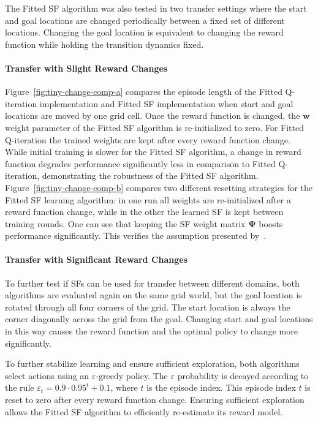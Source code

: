 \documentclass{article}
\begin{document}
The Fitted SF algorithm was also tested in two transfer settings where the start and goal locations are changed periodically between a fixed set of different locations.
Changing the goal location is equivalent to changing the reward function while holding the transition dynamics fixed.

\paragraph{Transfer with Slight Reward Changes}
Figure~\ref{fig:tiny-change-comp-a} compares the episode length of the Fitted Q-iteration implementation and Fitted SF implementation when start and goal locations are moved by one grid cell.
Once the reward function is changed, the $\pmb{w}$ weight parameter of the Fitted SF algorithm is re-initialized to zero.
For Fitted Q-iteration the trained weights are kept after every reward function change.
While initial training is slower for the Fitted SF algorithm, a change in reward function degrades performance significantly less in comparison to Fitted Q-iteration, demonstrating the robustness of the Fitted SF algorithm. 
Figure~\ref{fig:tiny-change-comp-b} compares two different resetting strategies for the Fitted SF learning algorithm: in one run all weights are re-initialized after a reward function change, while in the other the learned SF is kept between training rounds.
One can see that keeping the SF weight matrix $\pmb{\Psi}$ boosts performance significantly.
This verifies the assumption presented by~\citeauthor{barreto2016successor}.

\paragraph{Transfer with Significant Reward Changes} 
To further test if SFs can be used for transfer between different domains, both algorithms are evaluated again on the same grid world, but the goal location is rotated through all four corners of the grid.
The start location is always the corner diagonally across the grid from the goal.
Changing start and goal locations in this way causes the reward function and the optimal policy to change more significantly. 

To further stabilize learning and ensure sufficient exploration, both algorithms select actions using an $\varepsilon$-greedy policy.
The $\varepsilon$ probability is decayed according to the rule $\varepsilon_t = 0.9 \cdot 0.95^t + 0.1$, where $t$ is the episode index.
This episode index $t$ is reset to zero after every reward function change.
Ensuring sufficient exploration allows the Fitted SF algorithm to efficiently re-estimate its reward model.
\end{document}
